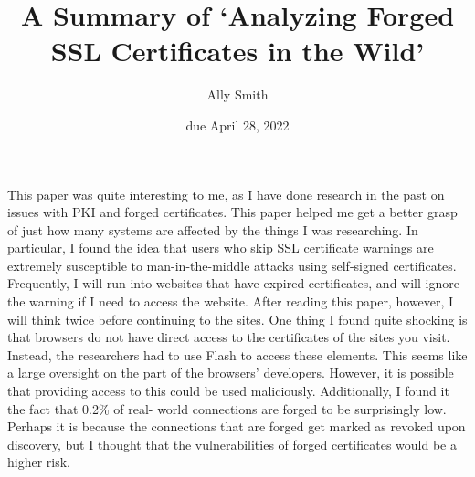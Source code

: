 \documentclass[12pt]{article}
\title{\bf A Summary of `Analyzing Forged SSL Certificates in the Wild'}
\author{Ally Smith}
\date{due April 28, 2022}
\begin{document}
\maketitle{}

This paper was quite interesting to me, as I have done research in the past on
issues with PKI and forged certificates. This paper helped me get a better grasp
of just how many systems are affected by the things I was researching. In
particular, I found the idea that users who skip SSL certificate warnings are
extremely susceptible to man-in-the-middle attacks using self-signed
certificates. Frequently, I will run into websites that have expired
certificates, and will ignore the warning if I need to access the website. After
reading this paper, however, I will think twice before continuing to the sites.
One thing I found quite shocking is that browsers do not have direct access to
the certificates of the sites you visit. Instead, the researchers had to use
Flash to access these elements. This seems like a large oversight on the part of
the browsers' developers. However, it is possible that providing access to this
could be used maliciously. Additionally, I found it the fact that 0.2\% of real-
world connections are forged to be surprisingly low. Perhaps it is because the
connections that are forged get marked as revoked upon discovery, but I thought
that the vulnerabilities of forged certificates would be a higher risk.
\end{document}
